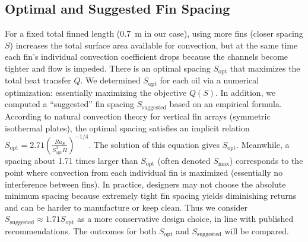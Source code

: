 \documentclass[12pt]{article}
\begin{document}
\subsection{Optimal and Suggested Fin Spacing}
For a fixed total finned length (0.7~m in our case), using more fins (closer spacing $S$) increases the total surface area available for convection, but at the same time each fin’s individual convection coefficient drops because the channels become tighter and flow is impeded. There is an optimal spacing $S_{\text{opt}}$ that maximizes the total heat transfer $Q$. We determined $S_{\text{opt}}$ for each oil via a numerical optimization: essentially maximizing the objective $Q(S)$. In addition, we computed a “suggested” fin spacing $S_{\text{suggested}}$ based on an empirical formula. According to natural convection theory for vertical fin arrays (symmetric isothermal plates), the optimal spacing satisfies an implicit relation $S_{\text{opt}} = 2.71 \left( \frac{Ra_S}{S_{\text{opt}}^3 H} \right)^{-1/4}$. The solution of this equation gives $S_{\text{opt}}$. Meanwhile, a spacing about 1.71 times larger than $S_{\text{opt}}$ (often denoted $S_{\max}$) corresponds to the point where convection from each individual fin is maximized (essentially no interference between fins). In practice, designers may not choose the absolute minimum spacing because extremely tight fin spacing yields diminishing returns and can be harder to manufacture or keep clean. Thus we consider $S_{\text{suggested}} \approx 1.71 S_{\text{opt}}$ as a more conservative design choice, in line with published recommendations. The outcomes for both $S_{\text{opt}}$ and $S_{\text{suggested}}$ will be compared.
\end{document}
